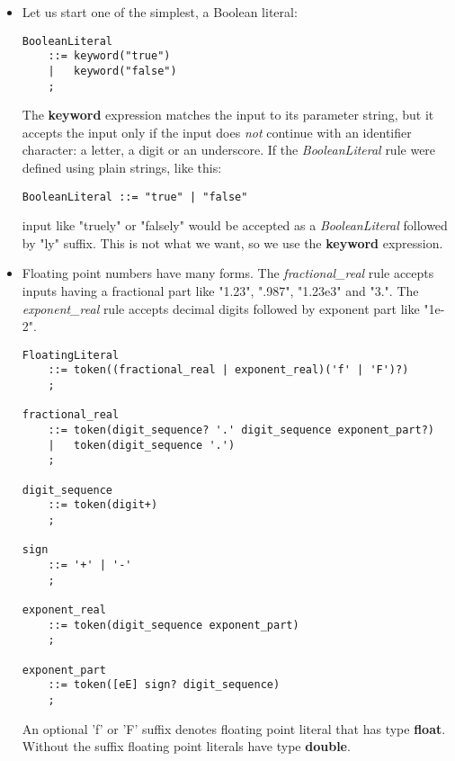 \documentclass[a4paper,oneside,11pt]{book}
\theoremstyle{definition}
\begin{document}
\begin{itemize}
\item
Let us start one of the simplest, a Boolean literal:

\begin{flushleft}
\begin{lstlisting}[language=cmpg,frame=trBL]
BooleanLiteral
    ::= keyword("true")
    |   keyword("false")
    ;
\end{lstlisting}
\end{flushleft}

The \textbf{keyword} expression matches the input to its parameter string,
but it accepts the input only if the input does \emph{not} continue with an identifier character:
a letter, a digit or an underscore.
If the \emph{BooleanLiteral} rule were defined using plain strings, like this:
\begin{flushleft}
\verb/BooleanLiteral ::= "true" | "false"/
\end{flushleft}
input like "truely" or "falsely" would be accepted as a \emph{BooleanLiteral} followed by "ly"
suffix. This is not what we want, so we use the \textbf{keyword} expression.

\item
Floating point numbers have many forms.
The \emph{fractional\_real} rule accepts inputs having a fractional part like
"1.23", ".987", "1.23e3" and "3.".
The \emph{exponent\_real} rule accepts decimal digits followed by exponent part like
"1e-2".

\begin{flushleft}
\begin{lstlisting}[language=cmpg,frame=trBL]
FloatingLiteral
    ::= token((fractional_real | exponent_real)('f' | 'F')?)
    ;

fractional_real
    ::= token(digit_sequence? '.' digit_sequence exponent_part?)
    |   token(digit_sequence '.')
    ;

digit_sequence
    ::= token(digit+)
    ;

sign
    ::= '+' | '-'
    ;

exponent_real
    ::= token(digit_sequence exponent_part)
    ;

exponent_part
    ::= token([eE] sign? digit_sequence)
    ;
\end{lstlisting}
\end{flushleft}

An optional 'f' or 'F' suffix denotes floating point literal that has type \textbf{float}.
Without the suffix floating point literals have type \textbf{double}.


\end{itemize}
\end{document}
